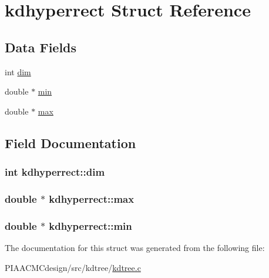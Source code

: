 \hypertarget{structkdhyperrect}{\section{kdhyperrect Struct Reference}
\label{structkdhyperrect}
}
\subsection*{Data Fields}
\begin{DoxyCompactItemize}
\item 
int \hyperlink{structkdhyperrect_a3db4daba51eb2a53cf9e94a6dbe8316a}{dim}
\item 
double $\ast$ \hyperlink{structkdhyperrect_a92ef472b9d95ec3de436762be743e990}{min}
\item 
double $\ast$ \hyperlink{structkdhyperrect_aaeaab78eb4536bcd8d4ae4d5e08540f5}{max}
\end{DoxyCompactItemize}


\subsection{Field Documentation}
\hypertarget{structkdhyperrect_a3db4daba51eb2a53cf9e94a6dbe8316a}{
\subsubsection[{dim}]{\setlength{\rightskip}{0pt plus 5cm}int kdhyperrect\+::dim}}\label{structkdhyperrect_a3db4daba51eb2a53cf9e94a6dbe8316a}
\hypertarget{structkdhyperrect_aaeaab78eb4536bcd8d4ae4d5e08540f5}{
\subsubsection[{max}]{\setlength{\rightskip}{0pt plus 5cm}double $\ast$ kdhyperrect\+::max}}\label{structkdhyperrect_aaeaab78eb4536bcd8d4ae4d5e08540f5}
\hypertarget{structkdhyperrect_a92ef472b9d95ec3de436762be743e990}{
\subsubsection[{min}]{\setlength{\rightskip}{0pt plus 5cm}double $\ast$ kdhyperrect\+::min}}\label{structkdhyperrect_a92ef472b9d95ec3de436762be743e990}


The documentation for this struct was generated from the following file\+:\begin{DoxyCompactItemize}
\item 
P\+I\+A\+A\+C\+M\+Cdesign/src/kdtree/\hyperlink{PIAACMCdesign_2src_2kdtree_2kdtree_8c}{kdtree.\+c}\end{DoxyCompactItemize}
